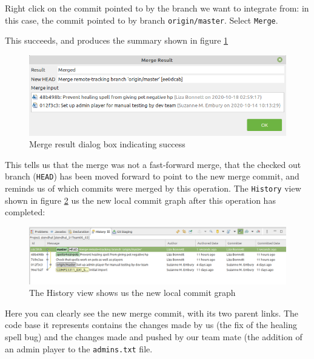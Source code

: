 \documentclass[
]{book}
\begin{document}
Right click on the commit pointed to by the branch we want to integrate from: in this case, the commit pointed to by branch \texttt{origin/master}. Select \texttt{Merge}.

This succeeds, and produces the summary shown in figure \ref{fig:mergeResultDialogueAfterNonFFMergeNoHistory-fig}

\begin{figure}

{\centering \includegraphics[width=1\linewidth]{images/mergeResultDialogueAfterNonFFMergeNoHistory} 

}

\caption{Merge result dialog box indicating success}\label{fig:mergeResultDialogueAfterNonFFMergeNoHistory-fig}
\end{figure}

This tells us that the merge was not a fast-forward merge, that the checked out branch (\texttt{HEAD}) has been moved forward to point to the new merge commit, and reminds us of which commits were merged by this operation. The \texttt{History} view shown in figure \ref{fig:localCommitGraphAfterNonFFMergeNoHistory-fig} us the new local commit graph after this operation has completed:

\begin{figure}

{\centering \includegraphics[width=1\linewidth]{images/localCommitGraphAfterNonFFMergeNoHistory} 

}

\caption{The History view shows us the new local commit graph}\label{fig:localCommitGraphAfterNonFFMergeNoHistory-fig}
\end{figure}

Here you can clearly see the new merge commit, with its two parent links. The code base it represents contains the changes made by us (the fix of the healing spell bug) and the changes made and pushed by our team mate (the addition of an admin player to the \texttt{admins.txt} file.
\end{document}
